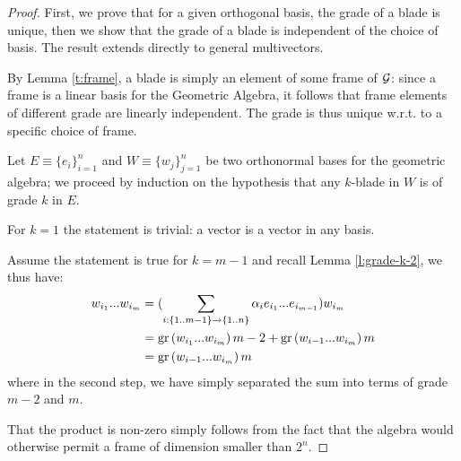 \begin{proof}
	First, we prove that for a given orthogonal basis, the grade of a blade is unique, then we show that the grade of a blade is independent of the choice of basis. The result extends directly to general multivectors.

	By Lemma \ref{t:frame}, a blade is simply an element of some frame of $\mathcal{G}$: since a frame is a linear basis for the Geometric Algebra, it follows that frame elements of different grade are linearly independent. The grade is thus unique w.r.t. to a specific choice of frame.

	Let $E \equiv \{e_i\}_{i=1}^n$ and $W \equiv \{w_j\}_{j=1}^n$ be two orthonormal bases for the geometric algebra; we proceed by induction on the hypothesis that any $k$-blade in $W$ is of grade $k$ in $E$.

	For $k=1$ the statement is trivial: a vector is a vector in any basis.

	Assume the statement is true for $k=m-1$ and recall Lemma \ref{l:grade-k-2}, we thus have:
	\begin{align*}
		w_{i_1}...w_{i_m} &= (\sum_{i: \{1..m-1\} \to \{1..n\}} \alpha_i e_{i_1}...e_{i_{m-1}})w_{i_m} \\
						  &= \mathrm{gr}\left(w_{i_1}...w_{i_m}\right){m-2} + \mathrm{gr}\left(w_{i-1}...w_{i_m}\right){m} \\
						  &= \mathrm{gr}\left(w_{i-1}...w_{i_m}\right){m}
	\end{align*}
	where in the second step, we have simply separated the sum into terms of grade $m-2$ and $m$.

	That the product is non-zero simply follows from the fact that the algebra would otherwise permit a frame of dimension smaller than $2^n$.

\end{proof}
